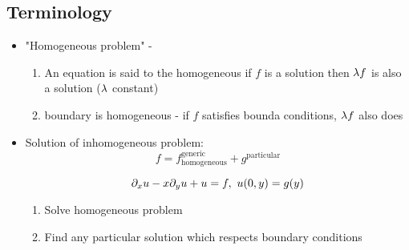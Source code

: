 \documentclass[Maths.tex]{subfiles}
\begin{document}
\subsection{Terminology}
\begin{itemize}
	\item "Homogeneous problem" -
	\begin{enumerate}
		\item An equation is said to the homogeneous if $f$ is a solution then $\lambda f$ is also a solution ($\lambda$ constant)
		\item boundary is homogeneous - if $f$ satisfies bounda conditions, $\lambda f$ also does
	\end{enumerate}
	\item Solution of inhomogeneous problem:
	\begin{equation*}
		f = f_{\text{homogeneous}}^{\text{generic}} + g^{\text{particular}}
	\end{equation*}
	\begin{example}
	\begin{equation*}
		\partial_xu - x\partial_yu + u = f,~ u(0,y) = g(y)
	\end{equation*}
	\begin{enumerate}
		\item Solve homogeneous problem
		\item Find any particular solution which respects boundary conditions
	\end{enumerate}
	\end{example}
\end{itemize}
\end{document}
